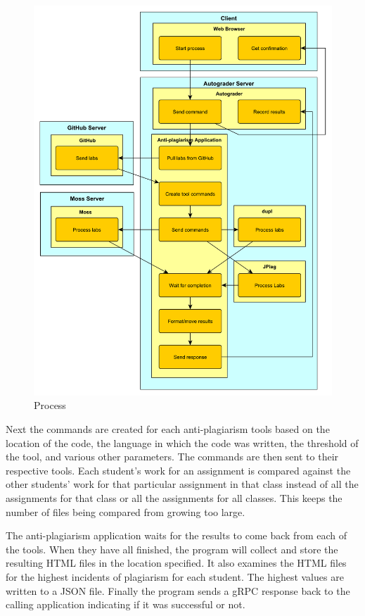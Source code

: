 \documentclass[journal,comsoc]{IEEEtran}
\begin{document}
			\begin{figure}[h!]
				\includegraphics[width=1.0\textwidth]{process2.pdf}
				\caption{Process}
				\label{fig:process}
			\end{figure}
	
			Next the commands are created for each anti-plagiarism tools based on the location of the code, the language in which the code was written, the threshold of the tool, and various other parameters. The commands are then sent to their respective tools. Each student's work for an assignment is compared against the other students' work for that particular assignment in that class instead of all the assignments for that class or all the assignments for all classes. This keeps the number of files being compared from growing too large.
			
			The anti-plagiarism application waits for the results to come back from each of the tools. When they have all finished, the program will collect and store the resulting HTML files in the location specified. It also examines the HTML files for the highest incidents of plagiarism for each student. The highest values are written to a JSON file. Finally the program sends a gRPC response back to the calling application indicating if it was successful or not.
			
\end{document}
